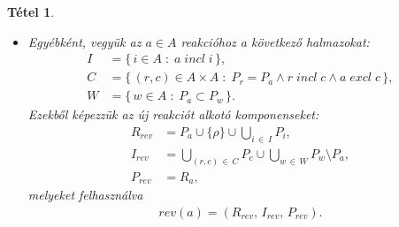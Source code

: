 \documentclass[12pt]{article}
\theoremstyle{definition}
\theoremstyle{remark}
\theoremstyle{plain}
\newtheorem*{theorem*}{Tétel}
\newcommand{\excl}{\; \textit{excl} \;}
\newcommand{\incl}{\; \textit{incl} \;}
\newcommand{\reaction}[3]{
    (#1, \, #2, \, #3)
}
\begin{document}
\begin{theorem*}
\begin{itemize}
            \item
            Egyébként, vegyük az $a \in A$ reakcióhoz a következő halmazokat:
            \begin{align*}
                I &= \{ \, i \in A \; : \; a \incl i \, \}, \\
                C &= \{ \, (r, c) \in A \times A \; : \; P_{r} = P_{a} \wedge r \incl c \wedge a \excl c \, \}, \\
                W &= \{ \, w \in A \; : \; P_{a} \subset P_{w} \, \}.
            \end{align*}
            Ezekből képezzük az új reakciót alkotó komponenseket:
            \begin{align*}
                R_{\textit{rev}} &= P_{a} \cup \{ \rho \} \cup \bigcup\limits_{i \,\in\, I} P_{i}, \\
                I_{\textit{rev}} &= \bigcup\limits_{(r, c) \,\in\, C}P_{c} \cup \bigcup\limits_{w \,\in\, W} P_{w} \setminus P_{a}, \\
                P_{\textit{rev}} &= R_{a},
            \end{align*}
            melyeket felhasználva
            \begin{align*}
                \textit{rev}(a) = \reaction{R_{\textit{rev}}}{I_{\textit{rev}}}{P_{\textit{rev}}}.
            \end{align*}
        \end{itemize}
    \end{theorem*}
\end{document}
